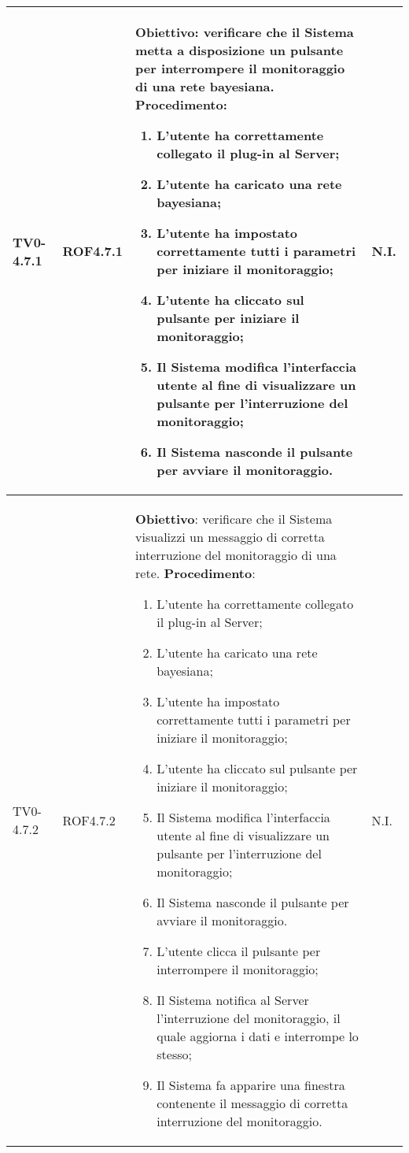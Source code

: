 \begin{longtable}{|C{.15\textwidth}|C{.13\textwidth}|m{.52\textwidth}|C{.08\textwidth}|}
TV0-4.7.1 & ROF4.7.1 &
	\textbf{Obiettivo}: verificare che il Sistema metta a disposizione un pulsante per interrompere il monitoraggio di una rete bayesiana. \newline
	\textbf{Procedimento}:
	\begin{enumerate}
		\item L'utente ha correttamente collegato il plug-in al Server;
		\item L'utente ha caricato una rete bayesiana;
		\item L'utente ha impostato correttamente tutti i parametri per iniziare il monitoraggio;
		\item L'utente ha cliccato sul pulsante per iniziare il monitoraggio;
		\item Il Sistema modifica l'interfaccia utente al fine di visualizzare un pulsante per l'interruzione del monitoraggio;
		\item Il Sistema nasconde il pulsante per avviare il monitoraggio.
	\end{enumerate}
	& N.I. \\
\hline

TV0-4.7.2 & ROF4.7.2 &
	\textbf{Obiettivo}: verificare che il Sistema visualizzi un messaggio di corretta interruzione del monitoraggio di una rete. \newline
	\textbf{Procedimento}:
	\begin{enumerate}
		\item L'utente ha correttamente collegato il plug-in al Server;
		\item L'utente ha caricato una rete bayesiana;
		\item L'utente ha impostato correttamente tutti i parametri per iniziare il monitoraggio;
		\item L'utente ha cliccato sul pulsante per iniziare il monitoraggio;
		\item Il Sistema modifica l'interfaccia utente al fine di visualizzare un pulsante per l'interruzione del monitoraggio;
		\item Il Sistema nasconde il pulsante per avviare il monitoraggio.
		\item L'utente clicca il pulsante per interrompere il monitoraggio;
		\item Il Sistema notifica al Server l'interruzione del monitoraggio, il quale aggiorna i dati e interrompe lo stesso;
		\item Il Sistema fa apparire una finestra contenente il messaggio di corretta interruzione del monitoraggio.
	\end{enumerate}
	& N.I. \\
\hline


\end{longtable}
